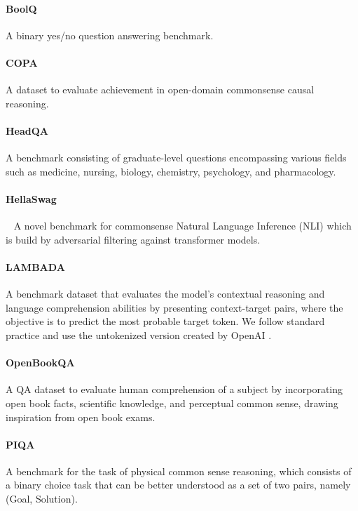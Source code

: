 \documentclass[11pt]{article}
\begin{document}
\paragraph{BoolQ ~\cite{clark2019boolq}} A binary yes/no question answering benchmark.
\paragraph{COPA ~\cite{COPA2011}} A dataset to evaluate achievement in open-domain commonsense causal reasoning.
\paragraph{HeadQA ~\cite{HeadQA2020}} A benchmark consisting of graduate-level questions encompassing various fields such as medicine, nursing, biology, chemistry, psychology, and pharmacology.
\paragraph{HellaSwag} ~\cite{HellaSwag2019} A novel benchmark for commonsense Natural Language Inference (NLI) which is build by adversarial filtering against transformer models. 
\paragraph{LAMBADA~\cite{LAMBADAdataset}} A benchmark dataset that evaluates the model's contextual reasoning and language comprehension abilities by presenting context-target pairs, where the objective is to predict the most probable target token. We follow standard practice and use the untokenized version created by OpenAI \citep{brown2020language}.
\paragraph{OpenBookQA ~\cite{OpenBookQA2018}} A QA dataset to evaluate human comprehension of a subject by incorporating open book facts, scientific knowledge, and perceptual common sense, drawing inspiration from open book exams.
\paragraph{PIQA~\cite{Bisk2020}} A benchmark for the task of physical common sense reasoning, which consists of a binary choice task that can be better understood as a set of two pairs, namely (Goal, Solution).%
\end{document}
